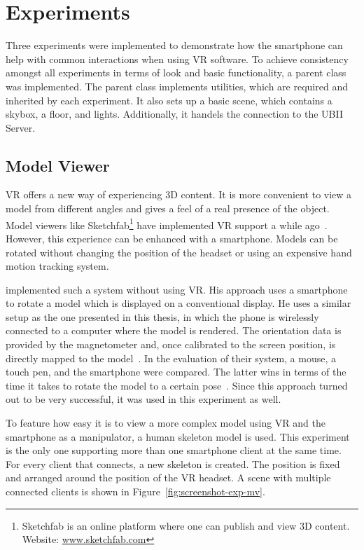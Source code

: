 \section{Experiments}\label{section:experiments}

Three experiments were implemented to demonstrate how the smartphone can help with common interactions when using \ac{VR} software.
To achieve consistency amongst all experiments in terms of look and basic functionality, a parent class was implemented. The parent class implements utilities, which are required and inherited by each experiment. It also sets up a basic scene, which contains a skybox, a floor, and lights. Additionally, it handels the connection to the \ac{UBII} Server. 


\subsection{Model Viewer}\label{subsection:model-viewer}

\acl{VR} offers a new way of experiencing \ac{3D} content. It is more convenient to view a model from different angles and gives a feel of a real presence of the object. Model viewers like Sketchfab\footnote{Sketchfab is an online platform where one can publish and view \ac{3D} content. Website: \href{https://sketchfab.com}{www.sketchfab.com}} have implemented \ac{VR} support a while ago~\cite{Denoyel.2016}. However, this experience can be enhanced with a smartphone. Models can be rotated without changing the position of the headset or using an expensive hand motion tracking system.

\citeauthor{Katzakis.2010} implemented such a system without using \ac{VR}. His approach uses a smartphone to rotate a model which is displayed on a conventional display. He uses a similar setup as the one presented in this thesis, in which the phone is wirelessly connected to a computer where the model is rendered. The orientation data is provided by the magnetometer and, once calibrated to the screen position, is directly mapped to the model~\cite[139]{Katzakis.2010}. In the evaluation of their system, a mouse, a touch pen, and the smartphone were compared. The latter wins in terms of the time it takes to rotate the model to a certain pose~\cite[140]{Katzakis.2010}. 
Since this approach turned out to be very successful, it was used in this experiment as well. 

To feature how easy it is to view a more complex model using VR and the smartphone as a manipulator, a human skeleton model is used. This experiment is the only one supporting more than one smartphone client at the same time. For every client that connects, a new skeleton is created. The position is fixed and arranged around the position of the \ac{VR} headset. A scene with multiple connected clients is shown in Figure~\ref{fig:screenshot-exp-mv}.

